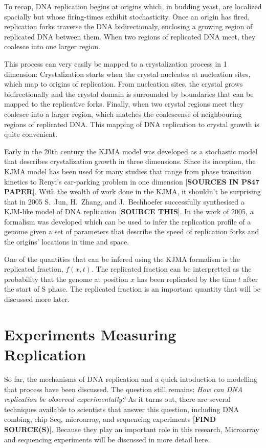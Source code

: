 	To recap, DNA replication begins at origins which, in budding yeast, are localized spacially but whose firing-times exhibit stochasticity.
	Once an origin has fired, replication forks traverse the DNA bidirectionaly, enclosing a growing region of replicated DNA between them.
	When two regions of replicated DNA meet, they coalesce into one larger region.
	
	This process can very easily be mapped to a crystalization process in 1 dimension:
	Crystalization starts when the crystal nucleates at nucleation sites, which map to origins of replication.
	From nucleation sites, the crystal grows bidirectionally and the crystal domain is surrounded by boundaries that can be mapped to the replicative forks.
	Finally, when two crystal regions meet they coalesce into a larger region, which matches the coalescense of neighbouring regions of replicated DNA.
	This mapping of DNA replication to crystal growth is quite convenient.
	
	Early in the 20th century the KJMA model was developed as a stochastic model that describes crystalization growth in three dimensions.
	Since its inception, the KJMA model has been used for many studies that range from phase transition kinetics to Renyi's car-parking problem in one dimension [\textbf{SOURCES IN P847 PAPER}].
	With the wealth of work done in the KJMA, it shouldn't be surprising that in 2005 S.~Jun, H.~Zhang, and J.~Bechhoefer successfully synthesised a KJM-like model of DNA replication [\textbf{SOURCE THIS}].
	In the work of 2005, a formalism was developed which can be used to infer the replication profile of a genome given a set of parameters that describe the speed of replication forks and the origins' locations in time and space.
	
	One of the quantities that can be infered using the KJMA formalism is the replicated fraction, $f(x,t)$.
	The replicated fraction can be interpretted as the probability that the genome at position $x$ has been replicated by the time $t$ after the start of S phase.
	The replicated fraction is an important quantity that will be discussed more later.
	
	
	\section{Experiments Measuring Replication}
	
	So far, the mechanisms of DNA replication and a quick intoduction to modelling that process have been discussed.
	The question still remains:
	\emph{How can DNA replication be observed experimentally?}
	As it turns out, there are several techniques available to scientists that answer this question, including DNA combing, chip Seq, microarray, and sequencing experiments [\textbf{FIND SOURCE(S)}].
	Because they play an important role in this research, Microarray and sequencing experiments will be discussed in more detail here.
	
